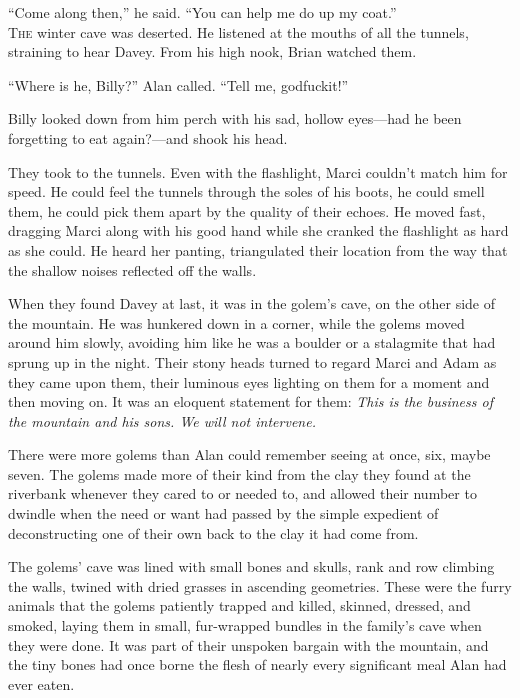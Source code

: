 ``Come along then,'' he said.  ``You can help me do up my coat.''
\\
\lettrine[lines=3, lhang=.5, nindent=0pt, findent=2pt]{T}{he} winter cave was deserted.  He listened at the mouths of all the
tunnels, straining to hear Davey.  From his high nook, Brian watched
them.

``Where is he, Billy?'' Alan called.  ``Tell me, godfuckit!''

Billy looked down from him perch with his sad, hollow eyes---had he
been forgetting to eat again?---and shook his head.

They took to the tunnels.  Even with the flashlight, Marci couldn't
match him for speed.  He could feel the tunnels through the soles of
his boots, he could smell them, he could pick them apart by the
quality of their echoes.  He moved fast, dragging Marci along with his
good hand while she cranked the flashlight as hard as she could.  He
heard her panting, triangulated their location from the way that the
shallow noises reflected off the walls.

When they found Davey at last, it was in the golem's cave, on the
other side of the mountain.  He was hunkered down in a corner, while
the golems moved around him slowly, avoiding him like he was a boulder
or a stalagmite that had sprung up in the night.  Their stony heads
turned to regard Marci and Adam as they came upon them, their luminous
eyes lighting on them for a moment and then moving on.  It was an
eloquent statement for them:  \textit{This is the business of the
mountain and his sons.  We will not intervene.}

There were more golems than Alan could remember seeing at once, six,
maybe seven.  The golems made more of their kind from the clay they
found at the riverbank whenever they cared to or needed to, and
allowed their number to dwindle when the need or want had passed by
the simple expedient of deconstructing one of their own back to the
clay it had come from.

The golems' cave was lined with small bones and skulls, rank and row
climbing the walls, twined with dried grasses in ascending geometries. 
These were the furry animals that the golems patiently trapped and
killed, skinned, dressed, and smoked, laying them in small,
fur-wrapped bundles in the family's cave when they were done.  It was
part of their unspoken bargain with the mountain, and the tiny bones
had once borne the flesh of nearly every significant meal Alan had
ever eaten.

